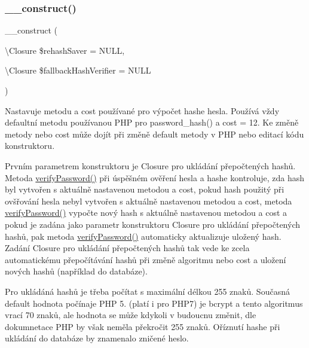 \subsubsection{\texorpdfstring{\+\_\+\+\_\+construct()}{\_\_construct()}}
{\footnotesize\ttfamily \+\_\+\+\_\+construct (\begin{DoxyParamCaption}\item[{\textbackslash{}Closure}]{\$rehash\+Saver = {\ttfamily NULL},  }\item[{\textbackslash{}Closure}]{\$fallback\+Hash\+Verifier = {\ttfamily NULL} }\end{DoxyParamCaption})}

Nastavuje metodu a cost používané pro výpočet hashe hesla. Používá vždy defaultní metodu používanou P\+HP pro password\+\_\+hash() a cost = 12. Ke změně metody nebo cost může dojít při změně default metody v P\+HP nebo editací kódu konstruktoru.

Prvním parametrem konstruktoru je Closure pro ukládání přepočtených hashů. Metoda \mbox{\hyperlink{class_pes_1_1_security_1_1_password_1_1_password_a66a5774f5734e6d66c32c500bf9ea335}{verify\+Password()}} při úspěšném ověření hesla a hashe kontroluje, zda hash byl vytvořen s aktuálně nastavenou metodou a cost, pokud hash použitý při ovšřování hesla nebyl vytvořen s aktuálně nastavenou metodou a cost, metoda \mbox{\hyperlink{class_pes_1_1_security_1_1_password_1_1_password_a66a5774f5734e6d66c32c500bf9ea335}{verify\+Password()}} vypočte nový hash s aktuálně nastavenou metodou a cost a pokud je zadána jako parametr konstruktoru Closure pro ukládání přepočtených hashů, pak metoda \mbox{\hyperlink{class_pes_1_1_security_1_1_password_1_1_password_a66a5774f5734e6d66c32c500bf9ea335}{verify\+Password()}} automaticky aktualizuje uložený hash. Zadání Closure pro ukládání přepočtených hashů tak vede ke zcela automatickému přepočítávání hashů při změně algoritmu nebo cost a uložení nových hashů (například do databáze).

Pro ukládáná hashů je třeba počítat s maximální délkou 255 znaků. Současná default hodnota počínaje P\+HP 5. (platí i pro P\+H\+P7) je bcrypt a tento algoritmus vrací 70 znaků, ale hodnota se může kdykoli v budoucnu změnit, dle dokumnetace P\+HP by však neměla překročit 255 znaků. Oříznutí hashe při ukládání do databáze by znamenalo zničené heslo.

